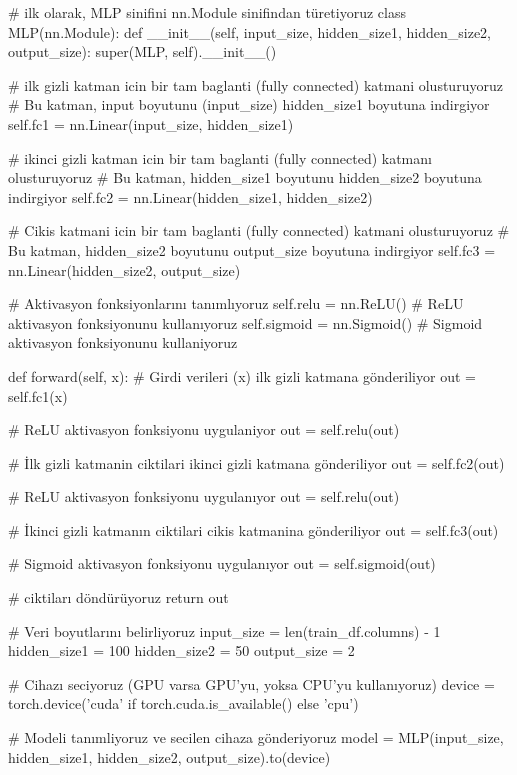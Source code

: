 \documentclass[11pt]{article}
\begin{document}
\begin{python}
# ilk olarak, MLP sinifini nn.Module sinifindan türetiyoruz
class MLP(nn.Module):
    def __init__(self, input_size, hidden_size1, hidden_size2, output_size):
        super(MLP, self).__init__()
        
        # ilk gizli katman icin bir tam baglanti (fully connected) katmani olusturuyoruz
        # Bu katman, input boyutunu (input_size) hidden_size1 boyutuna indirgiyor
        self.fc1 = nn.Linear(input_size, hidden_size1)
        
        # ikinci gizli katman icin bir tam baglanti (fully connected) katmanı olusturuyoruz
        # Bu katman, hidden_size1 boyutunu hidden_size2 boyutuna indirgiyor
        self.fc2 = nn.Linear(hidden_size1, hidden_size2)
        
        # Cikis katmani icin bir tam baglanti (fully connected) katmani olusturuyoruz
        # Bu katman, hidden_size2 boyutunu output_size boyutuna indirgiyor
        self.fc3 = nn.Linear(hidden_size2, output_size)
        
        # Aktivasyon fonksiyonlarını tanımlıyoruz
        self.relu = nn.ReLU() # ReLU aktivasyon fonksiyonunu kullanıyoruz
        self.sigmoid = nn.Sigmoid() # Sigmoid aktivasyon fonksiyonunu kullaniyoruz
        
    def forward(self, x):
        # Girdi verileri (x) ilk gizli katmana gönderiliyor
        out = self.fc1(x)
        
        # ReLU aktivasyon fonksiyonu uygulaniyor
        out = self.relu(out)
        
        # İlk gizli katmanin ciktilari ikinci gizli katmana gönderiliyor
        out = self.fc2(out)
        
        # ReLU aktivasyon fonksiyonu uygulanıyor
        out = self.relu(out)
        
        # İkinci gizli katmanın ciktilari cikis katmanina gönderiliyor
        out = self.fc3(out)
        
        # Sigmoid aktivasyon fonksiyonu uygulanıyor
        out = self.sigmoid(out)
        
        # ciktiları döndürüyoruz
        return out

# Veri boyutlarını belirliyoruz
input_size = len(train_df.columns) - 1
hidden_size1 = 100
hidden_size2 = 50
output_size = 2

# Cihazı seciyoruz (GPU varsa GPU'yu, yoksa CPU'yu kullanıyoruz)
device = torch.device('cuda' if torch.cuda.is_available() else 'cpu')

# Modeli tanımliyoruz ve secilen cihaza gönderiyoruz
model = MLP(input_size, hidden_size1, hidden_size2, output_size).to(device)

\end{python}
\end{document}

